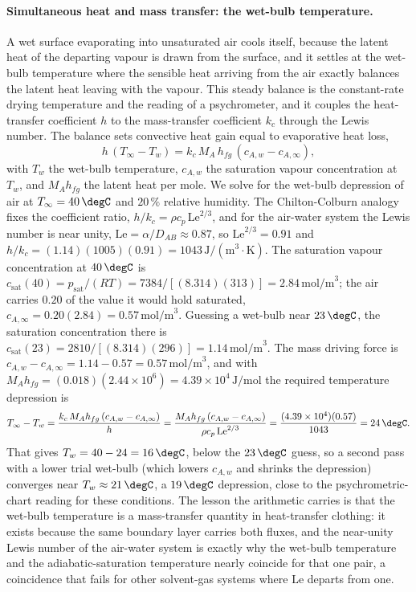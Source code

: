 \paragraph{Simultaneous heat and mass transfer: the wet-bulb temperature.}
A wet surface evaporating into unsaturated air cools itself, because the
latent heat of the departing vapour is drawn from the surface, and it settles
at the wet-bulb temperature where the sensible heat arriving from the air
exactly balances the latent heat leaving with the vapour. This steady balance
is the constant-rate drying temperature and the reading of a psychrometer, and
it couples the heat-transfer coefficient $h$ to the mass-transfer coefficient
$k_c$ through the Lewis number. The balance sets convective heat gain equal to
evaporative heat loss,
\[
h\,(T_\infty - T_w) = k_c\,M_A\,h_{fg}\,(c_{A,w} - c_{A,\infty}),
\]
with $T_w$ the wet-bulb temperature, $c_{A,w}$ the saturation vapour
concentration at $T_w$, and $M_A h_{fg}$ the latent heat per mole. We solve
for the wet-bulb depression of air at $T_\infty = 40\,\degC$ and $20\,\%$
relative humidity. The Chilton-Colburn analogy fixes the coefficient ratio,
$h/k_c = \rho c_p\,\text{Le}^{2/3}$, and for the air-water system the Lewis
number is near unity, $\text{Le} = \alpha/D_{AB} \approx 0.87$, so
$\text{Le}^{2/3} = 0.91$ and $h/k_c = (1.14)(1005)(0.91) = 1043\,\text{J}/
(\text{m}^3\cdot\text{K})$. The saturation vapour concentration at $40\,\degC$
is $c_{\text{sat}}(40) = p_{\text{sat}}/(RT) = 7384/[(8.314)(313)] =
2.84\,\text{mol/m}^3$; the air carries $0.20$ of the value it would hold
saturated, $c_{A,\infty} = 0.20(2.84) = 0.57\,\text{mol/m}^3$. Guessing a
wet-bulb near $23\,\degC$, the saturation concentration there is
$c_{\text{sat}}(23) = 2810/[(8.314)(296)] = 1.14\,\text{mol/m}^3$. The mass
driving force is $c_{A,w} - c_{A,\infty} = 1.14 - 0.57 = 0.57\,\text{mol/m}^3$,
and with $M_A h_{fg} = (0.018)(2.44\times 10^{6}) = 4.39\times 10^{4}\,
\text{J/mol}$ the required temperature depression is
\[
T_\infty - T_w = \frac{k_c\,M_A h_{fg}\,(c_{A,w}-c_{A,\infty})}{h} =
\frac{M_A h_{fg}\,(c_{A,w}-c_{A,\infty})}{\rho c_p\,\text{Le}^{2/3}} =
\frac{(4.39\times 10^{4})(0.57)}{1043} = 24\,\degC.
\]
That gives $T_w = 40 - 24 = 16\,\degC$, below the $23\,\degC$ guess, so a
second pass with a lower trial wet-bulb (which lowers $c_{A,w}$ and shrinks
the depression) converges near $T_w \approx 21\,\degC$, a $19\,\degC$
depression, close to the psychrometric-chart reading for these conditions.
The lesson the arithmetic carries is that the wet-bulb temperature is a
mass-transfer quantity in heat-transfer clothing: it exists because the same
boundary layer carries both fluxes, and the near-unity Lewis number of the
air-water system is exactly why the wet-bulb temperature and the
adiabatic-saturation temperature nearly coincide for that one pair, a
coincidence that fails for other solvent-gas systems where $\text{Le}$
departs from one.

